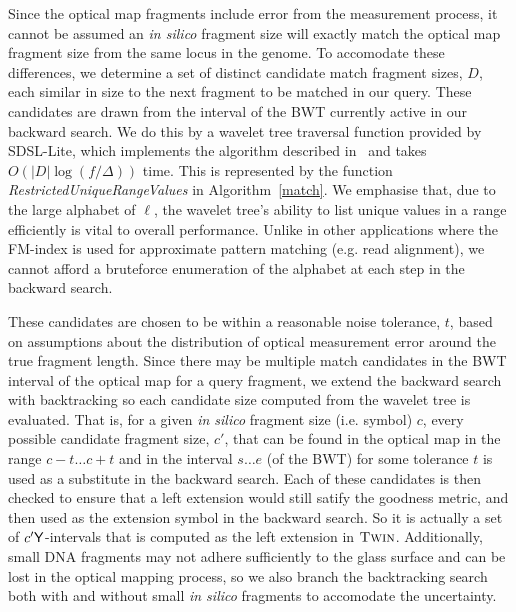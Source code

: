 
Since the optical map fragments include error from the measurement process, 
it cannot be assumed an {\em in silico} fragment size will exactly match the optical map fragment size from the same locus in the genome.
To accomodate these differences, we determine a set of distinct candidate match fragment sizes, $D$, each similar in size to the next fragment to be matched in our query. These candidates are drawn from the 
 interval of the BWT currently active in our backward search.
We do this by a wavelet tree traversal function provided by SDSL-Lite, which implements the algorithm described in~\cite{GNPtcs11} and takes $O(|D|\log(f/\Delta))$ time. This is represented by the function \emph{RestrictedUniqueRangeValues} in Algorithm~\ref{match}. We emphasise that, due to the large alphabet of $\ell $, the wavelet tree's ability to list unique values in a range efficiently is vital to overall performance. Unlike in other applications where the FM-index is used for approximate pattern matching (e.g. read alignment), we cannot afford a bruteforce enumeration of the alphabet at each step in the backward search.

These candidates are chosen to be within a reasonable noise tolerance, $t$, based on assumptions about the distribution of optical measurement error around the true fragment length.
 Since there may be multiple match candidates in the BWT interval of the optical map for a query fragment, we extend the backward search with backtracking so each candidate size computed from the wavelet tree is evaluated.  That is, for a given {\em in silico} fragment size (i.e. symbol) $c$, every possible candidate fragment size, $c'$, that can be found in the optical map in the range $c - t \ldots c + t$ and in the interval $s \ldots e$ (of the BWT) for some tolerance $t$ is used as a substitute in the backward search. Each of these candidates is then checked to ensure that a left extension would still satify the goodness metric, and then used as the extension symbol in the backward search.  So it is actually a set of $c'\mathsf{Y}$-intervals that is computed as the left extension in $\mbox{\rm {\sc Twin}}$.  Additionally, small DNA fragments may not adhere sufficiently to the glass surface and can be lost in the optical mapping process, so we also branch the backtracking search both with and without small {\em in silico} fragments to accomodate the uncertainty.

